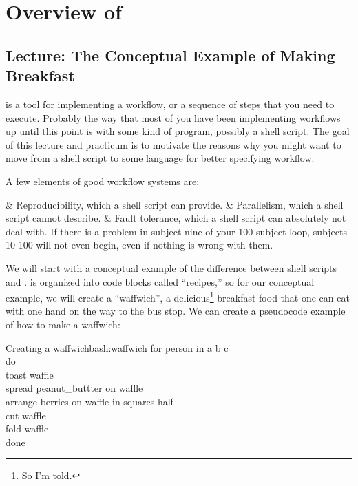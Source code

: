 \renewcommand{\chaptername}{Practicum}
\chapter{Overview of \maken{}}

\section{Lecture: The Conceptual Example of Making Breakfast}

\maken{} is a tool for implementing a workflow, or a sequence of steps that you need to execute. Probably the way that most of you have been implementing workflows up until this point is with some kind of program, possibly a shell script. The goal of this lecture and practicum is to motivate the reasons why you might want to move from a shell script to some language for better specifying workflow.

A few elements of good workflow systems are:
\begin{easylist}[itemize]
	& Reproducibility, which a shell script can provide.
	& Parallelism, which a shell script cannot describe.
	& Fault tolerance, which a shell script can absolutely not deal with. If there is a problem in subject nine of your 100-subject loop, subjects 10-100 will not even begin, even if nothing is wrong with them.
\end{easylist}

We will start with a conceptual example of the difference between shell scripts and \maken{}. \maken{} is organized into code blocks called ``recipes,'' so for our conceptual example, we will create a ``waffwich'', a delicious\footnote{So I'm told.} breakfast food that one can eat with one hand on the way to the bus stop. We can create a pseudocode   example of how to make a waffwich:
\begin{bash}{Creating a waffwich}{bash:waffwich}
	for person in a b c \\
	do \\
	toast waffle \\
	spread peanut_buttter \dd on waffle \\
	arrange berries \dd on waffle \dd in squares \dd half \\
	cut waffle \\ 
	fold waffle \\
	done
\end{bash}

